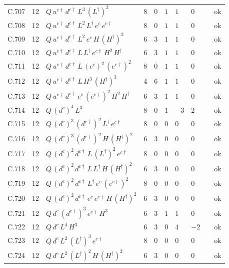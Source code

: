 {\begin{longtable}{@{}ll>{\raggedright\arraybackslash}p{6.4cm}rrllllr@{}}
C.707 & 12 & $Q\,u^{c\dagger}\,d^{c\dagger}\,L^{3}\,(L^\dagger)^{2}$ & 8 & 0 & $1$ & $1$ & $0$ &  & ok \\
C.708 & 12 & $Q\,u^{c\dagger}\,d^{c\dagger}\,L^{2}\,L^\dagger\,e^c\,e^{c\dagger}$ & 8 & 0 & $1$ & $1$ & $0$ &  & ok \\
C.709 & 12 & $Q\,u^{c\dagger}\,d^{c\dagger}\,L^{2}\,e^c\,H\,(H^\dagger)^{2}$ & 6 & 3 & $1$ & $1$ & $0$ &  & ok \\
C.710 & 12 & $Q\,u^{c\dagger}\,d^{c\dagger}\,L\,L^\dagger\,e^{c\dagger}\,H^{2}\,H^\dagger$ & 6 & 3 & $1$ & $1$ & $0$ &  & ok \\
C.711 & 12 & $Q\,u^{c\dagger}\,d^{c\dagger}\,L\,(e^c)^{2}\,(e^{c\dagger})^{2}$ & 8 & 0 & $1$ & $1$ & $0$ &  & ok \\
C.712 & 12 & $Q\,u^{c\dagger}\,d^{c\dagger}\,L\,H^{3}\,(H^\dagger)^{3}$ & 4 & 6 & $1$ & $1$ & $0$ &  & ok \\
C.713 & 12 & $Q\,u^{c\dagger}\,d^{c\dagger}\,e^c\,(e^{c\dagger})^{2}\,H^{2}\,H^\dagger$ & 6 & 3 & $1$ & $1$ & $0$ &  & ok \\
C.714 & 12 & $Q\,(d^c)^{4}\,L^{3}$ & 8 & 0 & $1$ & $-3$ & $2$ &  & ok \\
C.715 & 12 & $Q\,(d^c)^{3}\,(d^{c\dagger})^{2}\,L^\dagger\,e^{c\dagger}$ & 8 & 0 & $0$ & $0$ & $0$ &  & ok \\
C.716 & 12 & $Q\,(d^c)^{3}\,(d^{c\dagger})^{2}\,H\,(H^\dagger)^{2}$ & 6 & 3 & $0$ & $0$ & $0$ &  & ok \\
C.717 & 12 & $Q\,(d^c)^{2}\,d^{c\dagger}\,L\,(L^\dagger)^{2}\,e^{c\dagger}$ & 8 & 0 & $0$ & $0$ & $0$ &  & ok \\
C.718 & 12 & $Q\,(d^c)^{2}\,d^{c\dagger}\,L\,L^\dagger\,H\,(H^\dagger)^{2}$ & 6 & 3 & $0$ & $0$ & $0$ &  & ok \\
C.719 & 12 & $Q\,(d^c)^{2}\,d^{c\dagger}\,L^\dagger\,e^c\,(e^{c\dagger})^{2}$ & 8 & 0 & $0$ & $0$ & $0$ &  & ok \\
C.720 & 12 & $Q\,(d^c)^{2}\,d^{c\dagger}\,e^c\,e^{c\dagger}\,H\,(H^\dagger)^{2}$ & 6 & 3 & $0$ & $0$ & $0$ &  & ok \\
C.721 & 12 & $Q\,d^c\,(d^{c\dagger})^{3}\,e^{c\dagger}\,H^{3}$ & 6 & 3 & $1$ & $1$ & $0$ &  & ok \\
C.722 & 12 & $Q\,d^c\,L^{4}\,H^{3}$ & 6 & 3 & $0$ & $4$ & $-2$ &  & ok \\
C.723 & 12 & $Q\,d^c\,L^{2}\,(L^\dagger)^{3}\,e^{c\dagger}$ & 8 & 0 & $0$ & $0$ & $0$ &  & ok \\
C.724 & 12 & $Q\,d^c\,L^{2}\,(L^\dagger)^{2}\,H\,(H^\dagger)^{2}$ & 6 & 3 & $0$ & $0$ & $0$ &  & ok \\

\end{longtable}}
